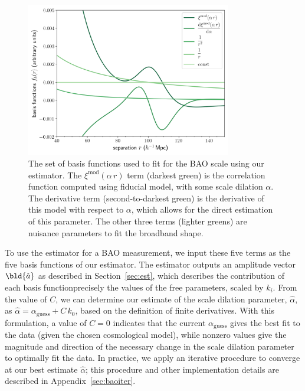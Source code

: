 \begin{figure}[t]
    \centering
    \includegraphics[width=0.8\textwidth]{bao_bases}
    \caption{The set of basis functions used to fit for the BAO scale using our estimator. The $\xi^\mathrm{mod}(\alpha\,r)$ term (darkest green) is the correlation function computed using fiducial model, with some scale dilation $\alpha$. The derivative term (second-to-darkest green) is the derivative of this model with respect to $\alpha$, which allows for the direct estimation of this parameter. The other three terms (lighter greens) are nuisance parameters to fit the broadband shape.}
    \label{fig:bao_bases}
\end{figure}

To use the estimator for a BAO measurement, we input these five terms as the five basis functions of our estimator.
The estimator outputs an amplitude vector $\bld{\hat a}$ as described in Section~\ref{sec:est}, which describes the contribution of each basis function{\emdash}precisely the values of the free parameters, scaled by $k_i$.
From the value of $C$, we can determine our estimate of the scale dilation parameter, $\hat{\alpha}$, as $\hat{\alpha} = \alpha_\mathrm{guess} + C\,k_0$, based on the definition of finite derivatives. 
With this formulation, a value of $C=0$ indicates that the current $\alpha_\mathrm{guess}$ gives the best fit to the data (given the chosen cosmological model), while nonzero values give the magnitude and direction of the necessary change in the scale dilation parameter to optimally fit the data.
In practice, we apply an iterative procedure to converge at our best estimate $\hat{\alpha}$; this procedure and other implementation details are described in Appendix~\ref{sec:baoiter}.

